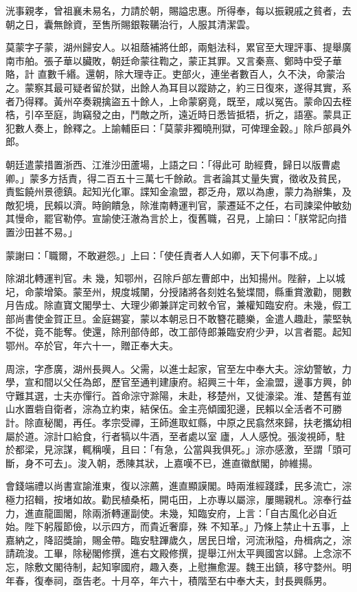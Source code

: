 \begin{pinyinscope}
 洸事親孝，曾祖襄未易名，力請於朝，賜謚忠惠。所得奉，每以振親戚之貧者，去朝之日，囊無餘資，至售所賜銀鞍韉治行，人服其清潔雲。



 莫蒙字子蒙，湖州歸安人。以祖蔭補將仕郎，兩魁法科，累官至大理評事、提舉廣南市舶。張子華以臟敗，朝廷命蒙往鞫之，蒙正其罪。又言秦熹、鄭時中受子華賂，計
 直數千緡。還朝，除大理寺正。吏部火，連坐者數百人，久不決，命蒙治之。蒙察其最可疑者留於獄，出餘人為耳目以蹤跡之，約三日復來，遂得其實，系者乃得釋。黃州卒奏親擒盜五十餘人，上命蒙窮竟，既至，咸以冤告。蒙命囚去桎梏，引卒至庭，詢竊發之由，鬥敵之所，遠近時日悉皆抵牾，折之，語塞。蒙具正犯數人奏上，餘釋之。上諭輔臣曰：「莫蒙非獨曉刑獄，可俾理金穀。」除戶部員外郎。



 朝廷遣蒙措置浙西、江淮沙田蘆場，上語之曰：「得此可
 助經費，歸日以版曹處卿。」蒙多方括責，得二百五十三萬七千餘畝。言者論其丈量失實，徵收及貧民，責監饒州景德鎮。起知光化軍。諜知金渝盟，郡乏舟，眾以為慮，蒙力為辦集，及敵犯境，民賴以濟。時餉饋急，除淮南轉運判官，蒙遷延不之任，右司諫梁仲敏劾其慢命，罷官勒停。宣諭使汪澈為言於上，復舊職，召見，上諭曰：「朕常記向措置沙田甚不易。」



 蒙謝曰：「職爾，不敢避怨。」上曰：「使任責者人人如卿，天下何事不成。」



 除湖北轉運判官。未
 幾，知鄂州，召除戶部左曹郎中，出知揚州。陛辭，上以城圮，命蒙增築。蒙至州，規度城闉，分授諸將各刻姓名甃堞間，縣重賞激勸，閱數月告成。除直寶文閣學士、大理少卿兼詳定司敕令官，兼權知臨安府。未幾，假工部尚書使金賀正旦。金庭錫宴，蒙以本朝忌日不敢簪花聽樂，金遣人趣赴，蒙堅執不從，竟不能奪。使還，除刑部侍郎，改工部侍郎兼臨安府少尹，以言者罷。起知鄂州。卒於官，年六十一，贈正奉大夫。



 周淙，字彥廣，湖州長興人。父需，以進士起家，官至左中奉大夫。淙幼警敏，力學，宣和間以父任為郎，歷官至通判建康府。紹興三十年，金渝盟，邊事方興，帥守難其選，士夫亦憚行。首命淙守滁陽，未赴，移楚州，又徙濠梁。淮、楚舊有並山水置砦自衛者，淙為立約束，結保伍。金主亮傾國犯邊，民賴以全活者不可勝計。除直秘閣，再任。孝宗受禪，王師進取虹縣，中原之民翕然來歸，扶老攜幼相屬於道。淙計口給食，行者犒以牛酒，至者處以室
 廬，人人感悅。張浚視師，駐於都梁，見淙謀，輒稱嘆，且曰：「有急，公當與我俱死。」淙亦感激，至謂「頭可斷，身不可去」。浚入朝，悉陳其狀，上嘉嘆不已，進直徽猷閣，帥維揚。



 會錢端禮以尚書宣諭淮東，復以淙薦，進直顯謨閣。時兩淮經踐蹂，民多流亡，淙極力招輯，按堵如故。勸民植桑柘，開屯田，上亦專以屬淙，屢賜親札。淙奉行益力，進直龍圖閣，除兩浙轉運副使。未幾，知臨安府，上言：「自古風化必自近始。陛下躬履節儉，以示四方，而貴近奢靡，殊
 不知革。」乃條上禁止十五事，上嘉納之，降詔獎諭，賜金帶。臨安駐蹕歲久，居民日增，河流湫隘，舟楫病之，淙請疏浚。工畢，除秘閣修撰，進右文殿修撰，提舉江州太平興國宮以歸。上念淙不忘，除敷文閣待制，起知寧國府，趣入奏，上慰撫愈渥。魏王出鎮，移守婺州。明年春，復奉祠，亟告老。十月卒，年六十，積階至右中奉大夫，封長興縣男。




\end{pinyinscope}
